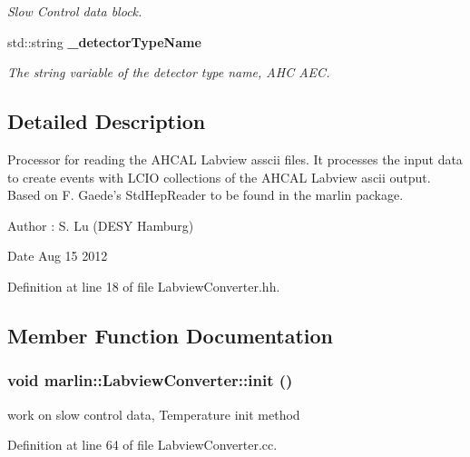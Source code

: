 \begin{DoxyCompactItemize}
\begin{DoxyCompactList}\small\item\em Slow Control data block. \item\end{DoxyCompactList}\item 
std::string {\bf \_\-detectorTypeName}\label{classmarlin_1_1LabviewConverter_a83fa755238559bb5051226ccaaf476a8}

\begin{DoxyCompactList}\small\item\em The string variable of the detector type name, AHC AEC. \item\end{DoxyCompactList}\end{DoxyCompactItemize}


\subsection{Detailed Description}
Processor for reading the AHCAL Labview asscii files. It processes the input data to create events with LCIO collections of the AHCAL Labview ascii output. Based on F. Gaede's StdHepReader to be found in the marlin package. \begin{DoxyAuthor}{Author}
: S. Lu (DESY Hamburg) 
\end{DoxyAuthor}
\begin{DoxyDate}{Date}
Aug 15 2012 
\end{DoxyDate}


Definition at line 18 of file LabviewConverter.hh.

\subsection{Member Function Documentation}
\subsubsection[{init}]{\setlength{\rightskip}{0pt plus 5cm}void marlin::LabviewConverter::init ()\hspace{0.3cm}{\ttfamily  [virtual]}}\label{classmarlin_1_1LabviewConverter_a537a93a94e2ac7ca4f7a7aa1fd9dbb56}


work on slow control data, Temperature init method 

Definition at line 64 of file LabviewConverter.cc.

